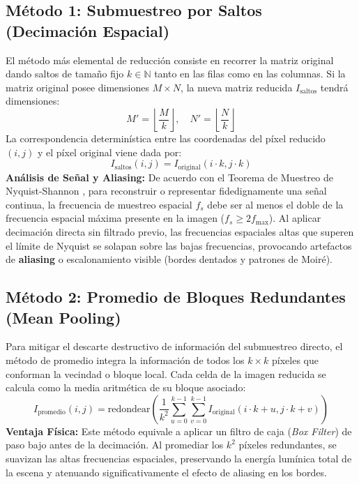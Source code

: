 \documentclass{article}
\begin{document}
\subsection{Método 1: Submuestreo por Saltos (Decimación Espacial)}
El método más elemental de reducción consiste en recorrer la matriz original dando saltos de tamaño fijo $k \in \mathbb{N}$ tanto en las filas como en las columnas. Si la matriz original posee dimensiones $M \times N$, la nueva matriz reducida $I_{\text{saltos}}$ tendrá dimensiones:
\begin{equation}
    M' = \left\lfloor \frac{M}{k} \right\rfloor, \quad N' = \left\lfloor \frac{N}{k} \right\rfloor
\end{equation}
La correspondencia determinística entre las coordenadas del píxel reducido $(i, j)$ y el píxel original viene dada por:
\begin{equation}
    \label{eq:saltos}
    I_{\text{saltos}}(i, j) = I_{\text{original}}(i \cdot k, j \cdot k)
\end{equation}
\textbf{Análisis de Señal y Aliasing:} De acuerdo con el Teorema de Muestreo de Nyquist-Shannon \cite{shannon1949communication}, para reconstruir o representar fidedignamente una señal continua, la frecuencia de muestreo espacial $f_s$ debe ser al menos el doble de la frecuencia espacial máxima presente en la imagen ($f_s \ge 2 f_{\max}$). Al aplicar decimación directa sin filtrado previo, las frecuencias espaciales altas que superen el límite de Nyquist se solapan sobre las bajas frecuencias, provocando artefactos de \textbf{aliasing} o escalonamiento visible (bordes dentados y patrones de Moiré).

\subsection{Método 2: Promedio de Bloques Redundantes (Mean Pooling)}
Para mitigar el descarte destructivo de información del submuestreo directo, el método de promedio integra la información de todos los $k \times k$ píxeles que conforman la vecindad o bloque local. Cada celda de la imagen reducida se calcula como la media aritmética de su bloque asociado:
\begin{equation}
    \label{eq:promedio}
    I_{\text{promedio}}(i, j) = \text{redondear}\left( \frac{1}{k^2} \sum_{u=0}^{k-1} \sum_{v=0}^{k-1} I_{\text{original}}(i \cdot k + u, j \cdot k + v) \right)
\end{equation}
\textbf{Ventaja Física:} Este método equivale a aplicar un filtro de caja (\textit{Box Filter}) de paso bajo antes de la decimación. Al promediar los $k^2$ píxeles redundantes, se suavizan las altas frecuencias espaciales, preservando la energía lumínica total de la escena y atenuando significativamente el efecto de aliasing en los bordes.
\end{document}
